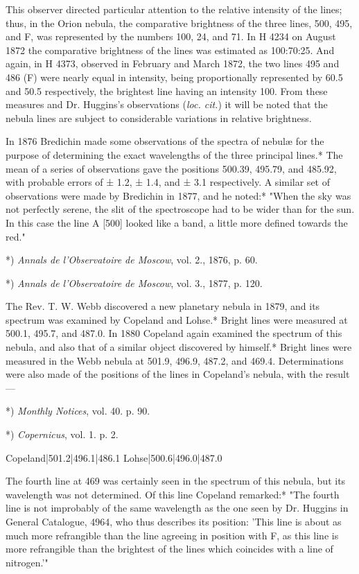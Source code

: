 \documentclass[a4paper, 12pt, oneside, polutonikogreek, english]{article}
\begin{document}
This observer directed particular attention to the relative intensity of the lines; thus, in the Orion nebula, the comparative brightness of the three lines, 500, 495, and F, was represented by the numbers 100, 24, and 71. In H 4234 on August 1872 the comparative brightness of the lines was estimated as 100:70:25. And again, in H 4373, observed in February and March 1872, the two lines 495 and 486 (F) were nearly equal in intensity, being proportionally represented by 60.5 and 50.5 respectively, the brightest line having an intensity 100. From these measures and Dr. Huggins's observations (\emph{loc. cit.}) it will be noted that the nebula lines are subject to considerable variations in relative brightness.

In 1876 Bredichin made some observations of the spectra of nebulæ for the purpose of determining the exact wavelengths of the three principal lines.* The mean of a series of observations gave the positions 500.39, 495.79, and 485.92, with probable errors of ± 1.2, ± 1.4, and ± 3.1 respectively. A similar set of observations were made by Bredichin in 1877, and he noted:* "When the sky was not perfectly serene, the slit of the spectroscope had to be wider than for the sun. In this case the line A [500] looked like a band, a little more defined towards the red."

*) \emph{Annals de l'Observatoire de Moscow}, vol. 2., 1876, p. 60.

*) \emph{Annals de l'Observatoire de Moscow}, vol. 3., 1877, p. 120.

The Rev. T. W. Webb discovered a new planetary nebula in 1879, and its spectrum was examined by Copeland and Lohse.* Bright lines were measured at 500.1, 495.7, and 487.0. In 1880 Copeland again examined the spectrum of this nebula, and also that of a similar object discovered by himself.* Bright lines were measured in the Webb nebula at 501.9, 496.9, 487.2, and 469.4. Determinations were also made of the positions of the lines in Copeland's nebula, with the result ---

*) \emph{Monthly Notices}, vol. 40. p. 90.

*) \emph{Copernicus}, vol. 1. p. 2.

Copeland|501.2|496.1|486.1 
Lohse|500.6|496.0|487.0

The fourth line at 469 was certainly seen in the spectrum of this nebula, but its wavelength was not determined. Of this line Copeland remarked:* "The fourth line is not improbably of the same wavelength as the one seen by Dr. Huggins in General Catalogue, 4964, who thus describes its position: 'This line is about as much more refrangible than the line agreeing in position with F, as this line is more refrangible than the brightest of the lines which coincides with a line of nitrogen.'"
\end{document}
